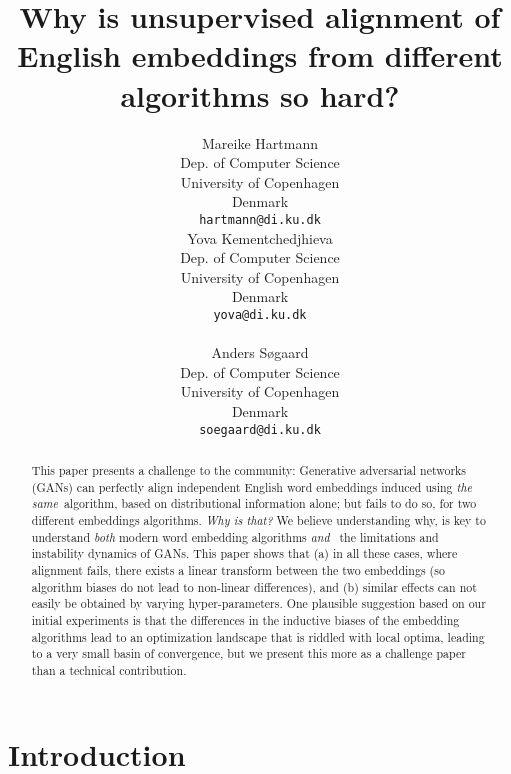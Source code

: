 \documentclass[11pt,a4paper]{article}
\title{Why is unsupervised alignment of English embeddings from different algorithms so hard?}
\author{Mareike Hartmann \\
  Dep. of Computer Science \\
  University of Copenhagen \\
  Denmark \\
  {\tt hartmann@di.ku.dk} \\\And
  Yova Kementchedjhieva \\
  Dep. of Computer Science \\
  University of Copenhagen \\
  Denmark \\
  {\tt yova@di.ku.dk} \\
  \\\And
   Anders S{\o}gaard  \\
  Dep. of Computer Science \\
  University of Copenhagen \\
  Denmark \\
  {\tt soegaard@di.ku.dk} \\}
\date{}
\begin{document}
\maketitle
\begin{abstract}
This paper presents a challenge to the community: Generative adversarial networks (GANs) can perfectly align independent English word embeddings induced using {\em the same}~algorithm, based on distributional information alone; but fails to do so, for two different embeddings algorithms. {\em Why is that?} We believe understanding why, is key to understand {\em both} modern word embedding algorithms {\em and } the limitations and instability dynamics of GANs. This paper shows that (a) in all these cases, where alignment fails, there exists a linear transform between the two embeddings (so algorithm biases do not lead to non-linear differences), and (b) similar effects can not easily be obtained by varying hyper-parameters. One plausible suggestion based on our initial experiments is that the differences in the inductive biases of the embedding  algorithms lead to an optimization landscape that is riddled with local optima, leading to a very small basin of convergence, but we present this more as a challenge paper than a technical contribution.  


\end{abstract}

\section{Introduction}
\end{document}
